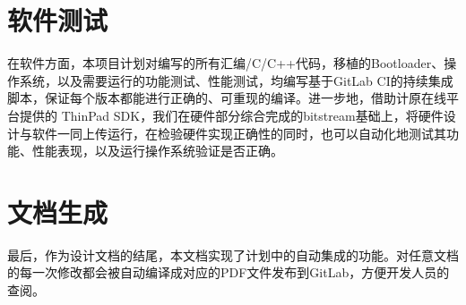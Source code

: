 \section{软件测试}

在软件方面，本项目计划对编写的所有汇编/C/C++代码，移植的Bootloader、操作系统，以及需要运行的功能测试、性能测试，均编写基于GitLab CI的持续集成脚本，保证每个版本都能进行正确的、可重现的编译。进一步地，借助计原在线平台提供的 ThinPad SDK，我们在硬件部分综合完成的bitstream基础上，将硬件设计与软件一同上传运行，在检验硬件实现正确性的同时，也可以自动化地测试其功能、性能表现，以及运行操作系统验证是否正确。

\section{文档生成}

最后，作为设计文档的结尾，本文档实现了计划中的自动集成的功能。对任意文档的每一次修改都会被自动编译成对应的PDF文件发布到GitLab，方便开发人员的查阅。
